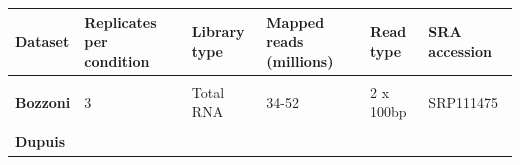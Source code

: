 
\begin{longtable}[]{@{}llllll@{}}
	\begin{minipage}[t]{0.14\columnwidth}\raggedright\strut
		{\textbf{Dataset}}\strut
	\end{minipage} & \begin{minipage}[t]{0.14\columnwidth}\raggedright\strut
		{\textbf{Replicates per condition}}\strut
	\end{minipage} & \begin{minipage}[t]{0.14\columnwidth}\raggedright\strut
		{\textbf{Library type}}\strut
	\end{minipage} & \begin{minipage}[t]{0.14\columnwidth}\raggedright\strut
		{\textbf{Mapped reads (millions)}}\strut
	\end{minipage} & \begin{minipage}[t]{0.14\columnwidth}\raggedright\strut
		{\textbf{Read type}}\strut
	\end{minipage} & \begin{minipage}[t]{0.14\columnwidth}\raggedright\strut
		{\textbf{SRA accession}}\strut
	\end{minipage}\tabularnewline\toprule \\[-0.3cm]
	\begin{minipage}[t]{0.14\columnwidth}\raggedright\strut
		{\textbf{Bozzoni} }\strut
	\end{minipage} & \begin{minipage}[t]{0.14\columnwidth}\raggedright\strut
		{3}\strut
	\end{minipage} & \begin{minipage}[t]{0.14\columnwidth}\raggedright\strut
		{Total RNA}\strut
	\end{minipage} & \begin{minipage}[t]{0.14\columnwidth}\raggedright\strut
		{34-52}\strut
	\end{minipage} & \begin{minipage}[t]{0.14\columnwidth}\raggedright\strut
		{2 x 100bp}\strut
	\end{minipage} & \begin{minipage}[t]{0.14\columnwidth}\raggedright\strut
		{SRP111475}\strut
	\end{minipage}\tabularnewline \\
	\begin{minipage}[t]{0.14\columnwidth}\raggedright\strut
		{\textbf{Dupuis}}\strut
	\end{minipage} & \begin{minipage}[t]{0.14\columnwidth}\raggedright\strut

\end{minipage}
\end{longtable}
